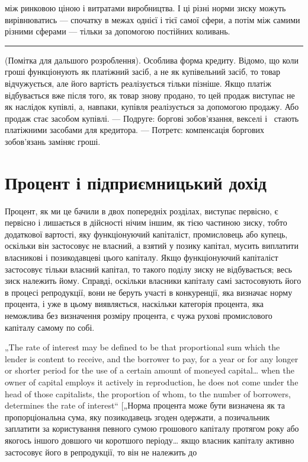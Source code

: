 \parcont{}  %
між ринковою ціною і витратами виробництва. І ці різні норми
зиску можуть вирівнюватись — спочатку в межах однієї і тієї
самої сфери, а потім між самими різними сферами — тільки за
допомогою постійних коливань.

\pfbreak

(Помітка для дальшого розроблення). Особлива форма кредиту.
Відомо, що коли гроші функціонують як платіжний засіб,
а не як купівельний засіб, то товар відчужується, але його
вартість реалізується тільки пізніше. Якщо платіж відбувається
вже після того, як товар знову продано, то цей продаж виступає
не як наслідок купівлі, а, навпаки, купівля реалізується за
допомогою продажу. Або продаж стає засобом купівлі. — Подруге:
боргові зобов’язання, векселі і~ стають платіжними
засобами для кредитора. — Потретє: компенсація боргових зобов’язань
заміняє гроші.

\section{Процент і підприємницький дохід}

Процент, як ми це бачили в двох попередніх розділах, виступає
первісно, є первісно і лишається в дійсності нічим
іншим, як тією частиною зиску, тобто додаткової вартості,
яку функціонуючий капіталіст, промисловець або купець,
оскільки він застосовує не власний, а взятий у позику капітал,
мусить виплатити власникові і позикодавцеві цього капіталу.
Якщо функціонуючий капіталіст застосовує тільки власний капітал,
то такого поділу зиску не відбувається; весь зиск належить
йому. Справді, оскільки власники капіталу самі застосовують
його в процесі репродукції, вони не беруть участі в
конкуренції, яка визначає норму процента, і уже в цьому виявляється,
наскільки категорія процента, яка неможлива без визначення
розміру процента, є чужа рухові промислового капіталу
самому по собі.

„The rate of interest may be defined to be that proportional sum
which the lender is content to receive, and the borrower to pay, for
a year or for any longer or shorter period for the use of a certain
amount of moneyed capital\dots{} when the owner of capital employs
it actively in reproduction, he does not come under the head of
those capitalists, the proportion of whom, to the number of borrowers,
determines the rate of interest“ [„Норма процента може
бути визначена як та пропорціональна сума, яку позикодавець
згоден одержати, а позичальник заплатити за користування певного
сумою грошового капіталу протягом року або якогось іншого
довшого чи коротшого періоду\dots{} якщо власник капіталу
активно застосовує його в репродукції, то він не належить до
\parbreak{}  %
